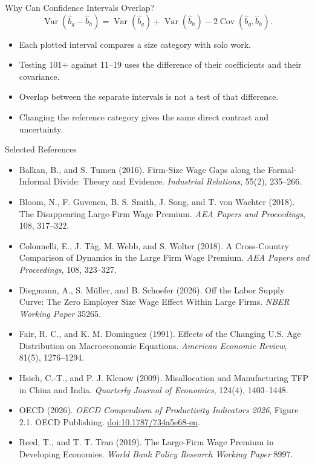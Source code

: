 \begin{frame}{Why Can Confidence Intervals Overlap?}
  \small
  \[
  \operatorname{Var}(\widehat b_g-\widehat b_h)
  =\operatorname{Var}(\widehat b_g)+\operatorname{Var}(\widehat b_h)
   -2\operatorname{Cov}(\widehat b_g,\widehat b_h).
  \]
  \begin{itemize}
    \item Each plotted interval compares a size category with solo work.
    \item Testing 101+ against 11--19 uses the difference of their coefficients and their covariance.
    \item Overlap between the separate intervals is not a test of that difference.
    \item Changing the reference category gives the same direct contrast and uncertainty.
  \end{itemize}
\end{frame}

\begin{frame}{Selected References}
  \scriptsize
  \begin{itemize}
    \item Balkan, B., and S. Tumen (2016). Firm-Size Wage Gaps along the Formal-Informal Divide: Theory and Evidence. \textit{Industrial Relations}, 55(2), 235--266.
    \item Bloom, N., F. Guvenen, B. S. Smith, J. Song, and T. von Wachter (2018). The Disappearing Large-Firm Wage Premium. \textit{AEA Papers and Proceedings}, 108, 317--322.
    \item Colonnelli, E., J. T{\aa}g, M. Webb, and S. Wolter (2018). A Cross-Country Comparison of Dynamics in the Large Firm Wage Premium. \textit{AEA Papers and Proceedings}, 108, 323--327.
    \item Diegmann, A., S. M\"uller, and B. Schoefer (2026). Off the Labor Supply Curve: The Zero Employer Size Wage Effect Within Large Firms. \textit{NBER Working Paper} 35265.
    \item Fair, R. C., and K. M. Dominguez (1991). Effects of the Changing U.S. Age Distribution on Macroeconomic Equations. \textit{American Economic Review}, 81(5), 1276--1294.
    \item Hsieh, C.-T., and P. J. Klenow (2009). Misallocation and Manufacturing TFP in China and India. \textit{Quarterly Journal of Economics}, 124(4), 1403--1448.
    \item OECD (2026). \textit{OECD Compendium of Productivity Indicators 2026}, Figure 2.1. OECD Publishing. \href{https://doi.org/10.1787/734a5e68-en}{doi:10.1787/734a5e68-en}.
    \item Reed, T., and T. T. Tran (2019). The Large-Firm Wage Premium in Developing Economies. \textit{World Bank Policy Research Working Paper} 8997.
  \end{itemize}
\end{frame}
